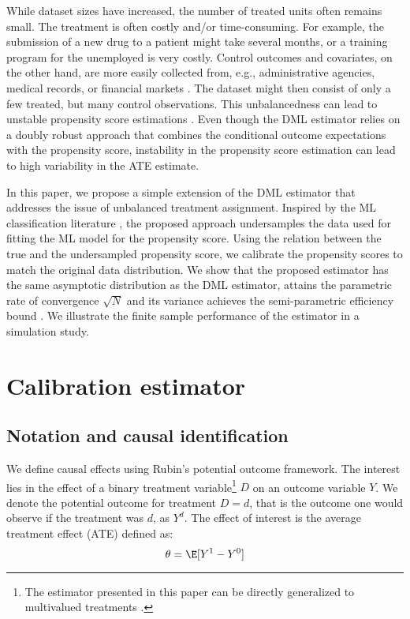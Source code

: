 While dataset sizes have increased, the number of treated units often remains small.
The treatment is often costly and/or time-consuming. For example, the submission of a new drug to a patient might take several months, or a training program for the unemployed is very costly. Control outcomes and covariates, on the other hand, are more easily collected from, e.g., administrative agencies, medical records, or financial markets \citep{Kunzel2019,Bouchaud2022,Hujer2006}. The dataset might then consist of only a few treated, but many control observations. This unbalancedness can lead to unstable propensity score estimations \citep{Huber2013}.
Even though the DML estimator relies on a doubly robust approach that combines the conditional outcome expectations with the propensity score, instability in the propensity score estimation can lead to high variability in the ATE estimate.

In this paper, we propose a simple extension of the DML estimator that addresses the issue of unbalanced treatment assignment. Inspired by the ML classification literature \citep{Japkowicz2002}, the proposed approach undersamples the data used for fitting the ML model for the propensity score. Using the relation between the true and the undersampled propensity score, we calibrate the propensity scores to match the original data distribution. We show that the proposed estimator has the same asymptotic distribution as the DML estimator, attains the parametric rate of convergence $\sqrt{N}$ and its variance achieves the semi-parametric efficiency bound \citep{Hahn1998}. We illustrate the finite sample performance of the estimator in a simulation study.


\section{Calibration estimator}
\subsection{Notation and causal identification}
We define causal effects using Rubin's \citeyear{Rubin1972} potential outcome framework. The interest lies in the effect of a binary treatment variable\footnote{The estimator presented in this paper can be directly generalized to multivalued treatments \citep[see, among others,][]{Farrell2015,Knaus2020}.} $D$ on an outcome variable $Y$. We denote the potential outcome for treatment $D=d$, that is the outcome one would observe if the treatment was $d$, as $Y^d$. The effect of interest is the average treatment effect (ATE) defined as:
\begin{equation}\label{eq:ate}
    \theta = \E[Y^1 - Y^0]
\end{equation}

